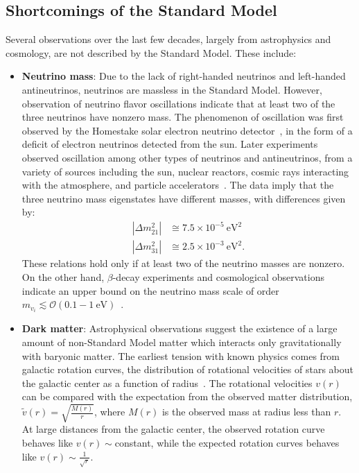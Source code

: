 \subsection{Shortcomings of the Standard Model}\label{sec:bsm-unexplained-phenomena}

Several observations over the last few decades, largely from astrophysics and cosmology, are not described by the Standard Model. These include:

\begin{itemize}
	\item \textbf{Neutrino mass}: Due to the lack of right-handed neutrinos and left-handed antineutrinos, neutrinos are massless in the Standard Model. However, observation of neutrino flavor oscillations indicate that at least two of the three neutrinos have nonzero mass. The phenomenon of oscillation was first observed by the Homestake solar electron neutrino detector~\cite{Cleveland:1998nv}, in the form of a deficit of electron neutrinos detected from the sun. Later experiments observed oscillation among other types of neutrinos and antineutrinos, from a variety of sources including the sun, nuclear reactors, cosmic rays interacting with the atmosphere, and particle accelerators~\cite{pdg}. The data imply that the three neutrino mass eigenstates have different masses, with differences given by:
	\begin{align}\label{eqn:neutrino-mass-differences}
		|\Delta m_{21}^2| &\cong 7.5\times 10^{-5}~\mbox{eV}^2 \\
		|\Delta m_{31}^2| &\cong 2.5\times 10^{-3}~\mbox{eV}^2.
	\end{align}
	These relations hold only if at least two of the neutrino masses are nonzero. On the other hand, $\beta$-decay experiments and cosmological observations indicate an upper bound on the neutrino mass scale of order $m_{v_i} \lesssim \mathcal{O}(0.1-\SI{1}{\electronvolt})$~\cite{Aseev:2011ia, Abazajian:2011ck, Ade:2013zuv}.

	\item \textbf{Dark matter}: Astrophysical observations suggest the existence of a large amount of non-Standard Model matter which interacts only gravitationally with baryonic matter. The earliest tension with known physics comes from galactic rotation curves, the distribution of rotational velocities of stars about the galactic center as a function of radius~\cite{1980ApJ_238_471R}. The rotational velocities $v(r)$ can be compared with the expectation from the observed matter distribution, $\tilde{v}(r)=\sqrt{\frac{M(r)}{r}}$, where $M(r)$ is the observed mass at radius less than $r$. At large distances from the galactic center, the observed rotation curve behaves like $v(r)\sim$constant, while the expected rotation curves behaves like $v(r)\sim \frac{1}{\sqrt{r}}$. 


\end{itemize}
